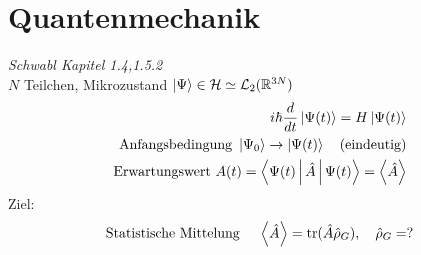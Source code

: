 \section{Quantenmechanik}

\emph{Schwabl Kapitel 1.4,1.5.2}\\
$N $ Teilchen, Mikrozustand $\Ket{\Psi} \in \mathcal{H} \simeq \mathcal{L}_2(\mathbb{R}^{3N})$
\begin{align*}
  i \hbar \frac{d}{dt} \Ket{\Psi(t)} = H \Ket{\Psi(t)} \\
  \text{Anfangsbedingung } \Ket{\Psi_0} \to \Ket{\Psi(t)} \quad \text{(eindeutig)} \\
  \text{Erwartungswert } A(t)= \Braket{\Psi(t) | \hat{A} | \Psi(t)} =\Braket{\hat{A}}\\
\end{align*}
Ziel: \[ \text{Statistische Mittelung } \quad \Braket{\hat{A}} = \operatorname{tr}(\hat{A}\hat{\rho}_G), \quad \hat{\rho}_G=? \] 
